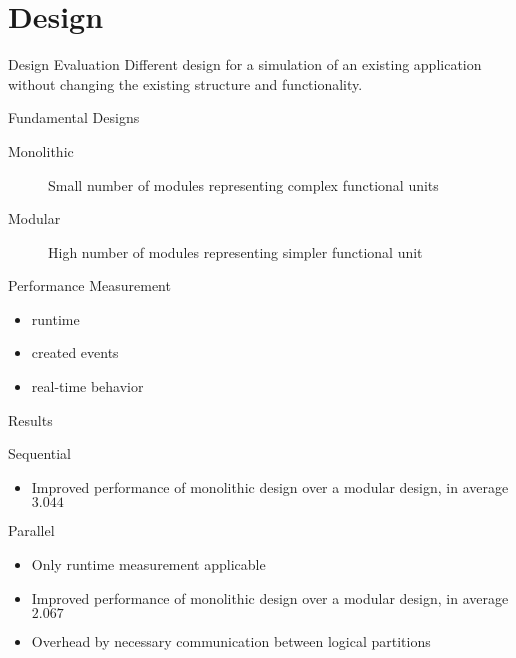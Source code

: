 \section{Design}
\begin{frame}{Design Evaluation}
    Different design for a simulation of an existing application without changing the existing structure and functionality.
    
    \begin{block}{Fundamental Designs}
        \begin{description}
            \item[Monolithic] Small number of modules representing complex functional units 
            \item[Modular] High number of modules representing simpler functional unit
        \end{description}
    \end{block}
    
    \begin{block}{Performance Measurement}
        \begin{itemize}
            \item runtime
            \item created events
            \item real-time behavior
        \end{itemize}
    \end{block}
\end{frame}

\begin{frame}{Results}
    
    
    \begin{block}{Sequential}
        \begin{itemize}
            \item Improved performance of monolithic design over a modular design, in average $3.044$
        \end{itemize}
    \end{block}
    
    \begin{block}{Parallel}
        \begin{itemize}
            \item Only runtime measurement applicable
            \item Improved performance of monolithic design over a modular design, in average $2.067$
            \item Overhead by necessary communication between logical partitions
        \end{itemize}
    \end{block}    
\end{frame}